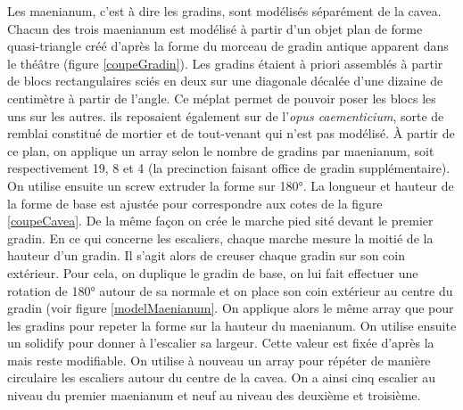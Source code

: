 Les maenianum, c'est à dire les gradins, sont modélisés séparément de la cavea. Chacun des trois maenianum est modélisé à partir d'un objet plan de forme quasi-triangle créé d'après la forme du morceau de gradin antique apparent dans le théâtre (figure \ref{coupeGradin}). Les gradins étaient à priori assemblés à partir de blocs rectangulaires sciés en deux sur une diagonale décalée d'une dizaine de centimètre à partir de l'angle. Ce méplat permet de pouvoir poser les blocs les uns sur les autres. ils reposaient également sur de l'\textit{opus caementicium}, sorte de remblai constitué de mortier et de tout-venant qui n'est pas modélisé. \`{A} partir de ce plan, on applique un \gls{array} selon le nombre de gradins par maenianum, soit respectivement 19, 8 et 4 (la precinction faisant office de gradin supplémentaire). On utilise ensuite un \gls{screw} extruder la forme sur 180°. La longueur et hauteur de la forme de base est ajustée pour correspondre aux cotes de la figure \ref{coupeCavea}. De la même façon on crée le marche pied sité devant le premier gradin. En ce qui concerne les escaliers, chaque marche mesure la moitié de la hauteur d'un gradin. Il s'agit alors de creuser chaque gradin sur son coin extérieur. Pour cela, on duplique le gradin de base, on lui fait effectuer une rotation de 180° autour de sa normale et on place son coin extérieur au centre du gradin (voir figure \ref{modelMaenianum}. On applique alors le même \gls{array} que pour les gradins pour repeter la forme sur la hauteur du maenianum. On utilise ensuite un \gls{solidify} pour donner à l'escalier sa largeur. Cette valeur est fixée d'après la \cite[Pl. XIX]{orangePl} mais reste modifiable. On utilise à nouveau un \gls{array} pour répéter de manière circulaire les escaliers autour du centre de la cavea. On a ainsi cinq escalier au niveau du premier maenianum et neuf au niveau des deuxième et troisième.



